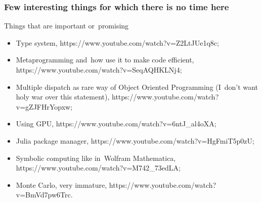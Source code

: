 \documentclass[10pt,t]{beamer}
\begin{document}
\begin{frame}
  \frametitle{Few interesting things for which there is no time
    here}


  Things that are important or~promising
  \begin{itemize}

  \item Type system,
    {https://www.youtube.com/watch?v=Z2LtJUe1q8c};

  \item Metaprogramming and~how use it to make code efficient,
    {https://www.youtube.com/watch?v=SeqAQHKLNj4};

  \item Multiple dispatch as rare way of Object Oriented Programming
    (I~don't want holy war over this statement),
    {https://www.youtube.com/watch?v=gZJFHrYopxw};

  \item Using GPU,
    {https://www.youtube.com/watch?v=6ntJ\_al4oXA};

  \item Julia package manager,
    {https://www.youtube.com/watch?v=HgFmiT5p0zU};

  \item Symbolic computing like in~Wolfram Mathematica,
    {https://www.youtube.com/watch?v=M742\_73edLA};

  \item Monte Carlo, very immature,
    {https://www.youtube.com/watch?v=BmVd7pw6Trc}.

  \end{itemize}

\end{frame}
\end{document}
